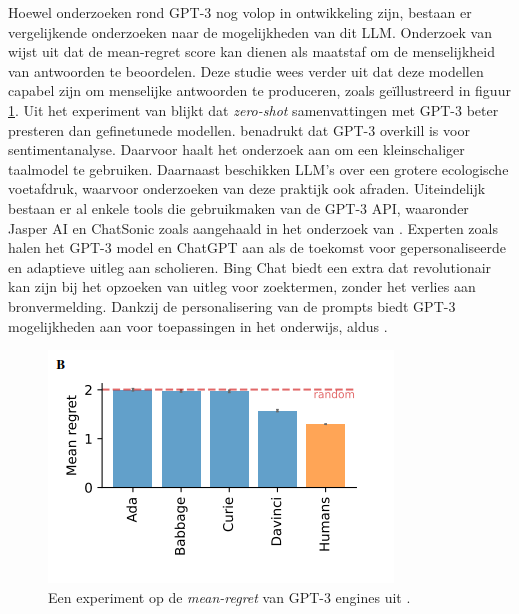 Hoewel onderzoeken rond GPT-3 nog volop in ontwikkeling zijn, bestaan er vergelijkende onderzoeken naar de mogelijkheden van dit LLM. Onderzoek van \textcite{Binz2023} wijst uit dat de mean-regret score kan dienen als maatstaf om de menselijkheid van antwoorden te beoordelen. Deze studie wees verder uit dat deze modellen capabel zijn om menselijke antwoorden te produceren, zoals geïllustreerd in figuur \ref{img:mean-regret-chatgpt}. Uit het experiment van \textcite{Goyal2022} blijkt dat \textit{zero-shot} samenvattingen met GPT-3 beter presteren dan gefinetunede modellen. \autocite{Li2022} benadrukt dat GPT-3 overkill is voor sentimentanalyse. Daarvoor haalt het onderzoek aan om een kleinschaliger taalmodel te gebruiken. Daarnaast beschikken LLM's over een grotere ecologische voetafdruk, waarvoor onderzoeken van \textcite{Strubell2019, Simon2021} deze praktijk ook afraden. Uiteindelijk bestaan er al enkele tools die gebruikmaken van de GPT-3 API, waaronder Jasper AI en ChatSonic zoals aangehaald in het onderzoek van \textcite{Mottesi2023}. Experten zoals \textcite{Roose2023, Garg2022} halen het GPT-3 model en ChatGPT aan als de toekomst voor gepersonaliseerde en adaptieve uitleg aan scholieren. Bing Chat biedt een extra dat revolutionair kan zijn bij het opzoeken van uitleg voor zoektermen, zonder het verlies aan bronvermelding. Dankzij de personalisering van de prompts biedt GPT-3 mogelijkheden aan voor toepassingen in het onderwijs, aldus \textcite{Roose2023, Garg2022}.

\begin{figure}[H]
	\begin{center}
		\includegraphics[width=\linewidth]{img/chatgpt-engines-mean-regret.png}
		\caption{Een experiment op de \textit{mean-regret} van GPT-3 engines uit \textcite{Binz2023}.}
		\label{img:mean-regret-chatgpt}
	\end{center}
\end{figure}

